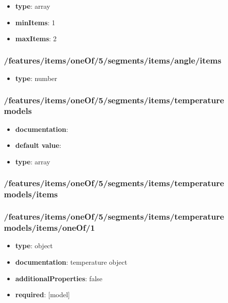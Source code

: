 \begin{itemize}\item {\bf type}: array
\item {\bf minItems}: 1
\item {\bf maxItems}: 2
\end{itemize}\subsubsection{/features/items/oneOf/5/segments/items/angle/items}
\begin{itemize}\item {\bf type}: number
\end{itemize}\subsubsection{/features/items/oneOf/5/segments/items/temperature models}
\begin{itemize}\item {\bf documentation}: 
\item {\bf default value}: 
\item {\bf type}: array
\end{itemize}\subsubsection{/features/items/oneOf/5/segments/items/temperature models/items}

\subsubsection{/features/items/oneOf/5/segments/items/temperature models/items/oneOf/1}
\begin{itemize}\item {\bf type}: object
\item {\bf documentation}: temperature object
\item {\bf additionalProperties}: false
\item {\bf required}: [model]\end{itemize}
